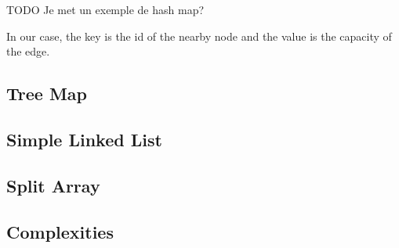 TODO Je met un exemple de hash map? \newline

In our case, the key is the id of the nearby node and the value is the capacity of the edge.
\subsection{Tree Map}

\subsection{Simple Linked List}

\subsection{Split Array}

\subsection{Complexities}

